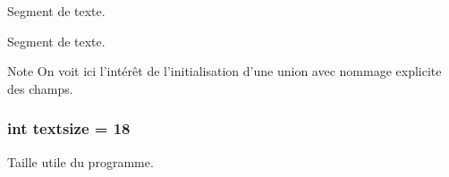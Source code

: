 \-Segment de texte. 

\-Segment de texte.

\begin{DoxyNote}{\-Note}
\-On voit ici l'intérêt de l'initialisation d'une union avec nommage explicite des champs. 
\end{DoxyNote}
\hypertarget{prog__subroutine-bin_8c_a09c9805cec0364d715497e6564245c48}{
\subsubsection[{textsize}]{\setlength{\rightskip}{0pt plus 5cm}int {\bf textsize} = 18}}\label{prog__subroutine-bin_8c_a09c9805cec0364d715497e6564245c48}


\-Taille utile du programme. 

